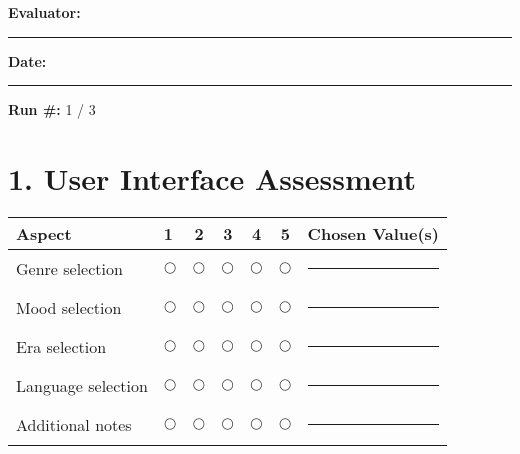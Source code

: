 \documentclass[11pt]{article}
\begin{document}
  \begin{center}
    \textbf{Evaluator:} \rule{4cm}{0.15mm} \hspace{0.5cm}
  \end{center}


  \begin{center}
    \textbf{Date:} \rule{3cm}{0.15mm} \hspace{0.5cm}
    \textbf{Run \#:} 1 / 3
  \end{center}

  \vspace{0.5cm}

  \section*{1. User Interface Assessment}
  \begin{center}
    \begin{tabular}{p{5cm}lccccl}
        \textbf{Aspect} & \textbf{1} & \textbf{2} & \textbf{3} & \textbf{4} & \textbf{5} & \textbf{Chosen Value(s)}\\
        \toprule
        Genre selection & $\bigcirc$ & $\bigcirc$ & $\bigcirc$ & $\bigcirc$ & $\bigcirc$ & \rule{6cm}{0.15mm}\\
        Mood selection & $\bigcirc$ & $\bigcirc$ & $\bigcirc$ & $\bigcirc$ & $\bigcirc$ & \rule{6cm}{0.15mm}\\
        Era selection & $\bigcirc$ & $\bigcirc$ & $\bigcirc$ & $\bigcirc$ & $\bigcirc$ & \rule{6cm}{0.15mm}\\
        Language selection & $\bigcirc$ & $\bigcirc$ & $\bigcirc$ & $\bigcirc$ & $\bigcirc$ & \rule{6cm}{0.15mm}\\
        Additional notes & $\bigcirc$ & $\bigcirc$ & $\bigcirc$ & $\bigcirc$ & $\bigcirc$ & \rule{6cm}{0.15mm}\\
    \end{tabular}
  \end{center}
\end{document}

